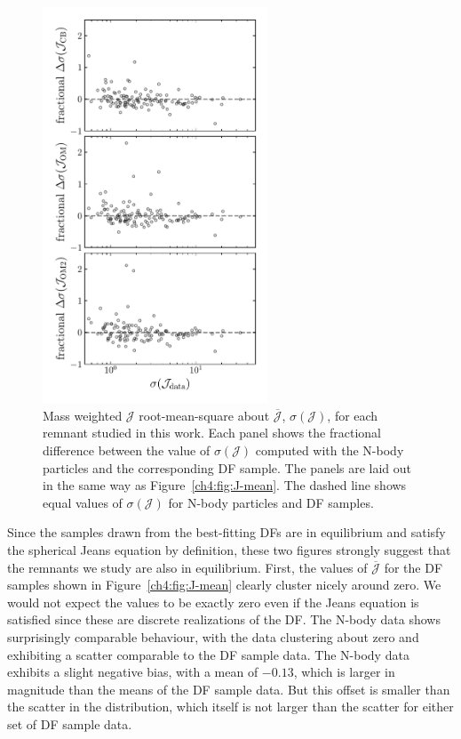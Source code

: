 \begin{figure}
    \centering
    \includegraphics[width=0.6\textwidth]{figure/ch4/J_dispersion.pdf}
    \caption{Mass weighted $\mathcal{J}$ root-mean-square about $\overline{\mathcal{J}}$, $\sigma(\mathcal{J})$, for each remnant studied in this work. Each panel shows the fractional difference between the value of $\sigma(\mathcal{J})$ computed with the N-body particles and the corresponding DF sample. The panels are laid out in the same way as Figure~\ref{ch4:fig:J-mean}. The dashed line shows equal values of $\sigma(\mathcal{J})$ for N-body particles and DF samples.}
    \label{ch4:fig:J-dispersion}
\end{figure}

Since the samples drawn from the best-fitting DFs are in equilibrium and satisfy the spherical Jeans equation by definition, these two figures strongly suggest that the remnants we study are also in equilibrium. First, the values of $\overline{\mathcal{J}}$ for the DF samples shown in Figure~\ref{ch4:fig:J-mean} clearly cluster nicely around zero. We would not expect the values to be exactly zero even if the Jeans equation is satisfied since these are discrete realizations of the DF. The N-body data shows surprisingly comparable behaviour, with the data clustering about zero and exhibiting a scatter comparable to the DF sample data. The N-body data exhibits a slight negative bias, with a mean of $-0.13$, which is larger in magnitude than the means of the DF sample data. But this offset is smaller than the scatter in the distribution, which itself is not larger than the scatter for either set of DF sample data.

